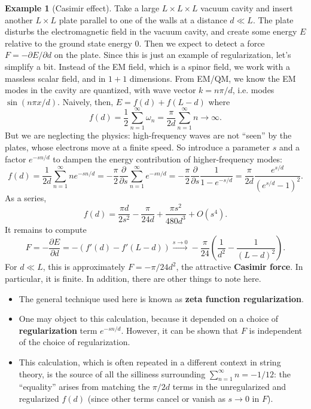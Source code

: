 \documentclass{report}
\theoremstyle{plain}
\theoremstyle{definition}
\newtheorem{example}[theorem]{Example}
\theoremstyle{remark}
\begin{document}
\begin{example}[Casimir effect]
  Take a large $L \times L \times L$ vacuum cavity and insert another
  $L \times L$ plate parallel to one of the walls at a distance
  $d \ll L$. The plate disturbs the electromagnetic field in the
  vacuum cavity, and create some energy $E$ relative to the ground
  state energy $0$. Then we expect to detect a force
  $F = -\partial E/\partial d$ on the plate. Since this is just an
  example of regularization, let's simplify a bit. Instead of the EM
  field, which is a spinor field, we work with a massless scalar
  field, and in $1+1$ dimensions. From EM/QM, we know the EM modes in
  the cavity are quantized, with wave vector $k = n\pi/d$, i.e. modes
  $\sin(n\pi x/d)$. Naively, then, $E = f(d) + f(L-d)$ where
  $$ f(d) = \frac{1}{2} \sum_{n=1}^\infty \omega_n = \frac{\pi}{2d} \sum_{n=1}^\infty n \to \infty. $$
  But we are neglecting the physics: high-frequency waves are not
  ``seen'' by the plates, whose electrons move at a finite speed. So
  introduce a parameter $s$ and a factor $e^{-sn/d}$ to dampen the
  energy contribution of higher-frequency modes:
  $$ f(d) = \frac{1}{2d} \sum_{n=1}^\infty ne^{-sn/d} = -\frac{\pi}{2} \frac{\partial}{\partial s} \sum_{n=1}^\infty e^{-sn/d} = -\frac{\pi}{2} \frac{\partial}{\partial s} \frac{1}{1 - e^{-s/d}} = \frac{\pi}{2d} \frac{e^{s/d}}{(e^{s/d} - 1)^2}. $$
  As a series,
  $$ f(d) = \frac{\pi d}{2s^2} - \frac{\pi}{24d} + \frac{\pi s^2}{480d^3} + O(s^4). $$
  It remains to compute
  $$ F = -\frac{\partial E}{\partial d} = -(f'(d) - f'(L - d)) \xrightarrow{s \to 0} -\frac{\pi}{24} \left(\frac{1}{d^2} - \frac{1}{(L-d)^2}\right). $$
  For $d \ll L$, this is approximately $F = -\pi/24d^2$, the
  attractive {\bf Casimir force}. In particular, it is finite. In
  addition, there are other things to note here.
  \begin{itemize}
  \item The general technique used here is known as {\bf zeta function
      regularization}.
  \item One may object to this calculation, because it depended on a
    choice of {\bf regularization} term $e^{-sn/d}$. However, it can
    be shown that $F$ is independent of the choice of regularization.
  \item This calculation, which is often repeated in a different
    context in string theory, is the source of all the silliness
    surrounding $\sum_{n=1}^\infty n = -1/12$: the ``equality'' arises
    from matching the $\pi/2d$ terms in the unregularized and
    regularized $f(d)$ (since other terms cancel or vanish as
    $s \to 0$ in $F$).
  \end{itemize}
\end{example}
\end{document}
